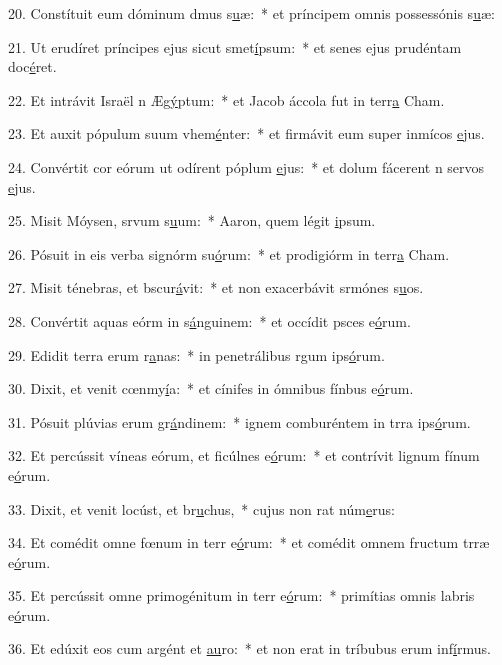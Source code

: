 20. Constítuit eum dóminum dmus s\uline{u}æ:~* et príncipem omnis possessónis s\uline{u}æ:\par 
21. Ut erudíret príncipes ejus sicut smet\uline{í}psum:~* et senes ejus prudéntam doc\uline{é}ret.\par 
22. Et intrávit Israël n Æg\uline{ý}ptum:~* et Jacob áccola fut in terr\uline{a} Cham.\par 
23. Et auxit pópulum suum vhem\uline{é}nter:~* et firmávit eum super inmícos \uline{e}jus.\par 
24. Convértit cor eórum ut odírent póplum \uline{e}jus:~* et dolum fácerent n servos \uline{e}jus.\par 
25. Misit Móysen, srvum s\uline{u}um:~* Aaron, quem légit \uline{i}psum.\par 
26. Pósuit in eis verba signórm su\uline{ó}rum:~* et prodigiórm in terr\uline{a} Cham.\par 
27. Misit ténebras, et bscur\uline{á}vit:~* et non exacerbávit srmónes s\uline{u}os.\par 
28. Convértit aquas eórm in s\uline{á}nguinem:~* et occídit psces e\uline{ó}rum.\par 
29. Edidit terra erum r\uline{a}nas:~* in penetrálibus rgum ips\uline{ó}rum.\par 
30. Dixit, et venit cœnmy\uline{í}a:~* et cínifes in ómnibus fínbus e\uline{ó}rum.\par 
31. Pósuit plúvias erum gr\uline{á}ndinem:~* ignem comburéntem in trra ips\uline{ó}rum.\par 
32. Et percússit víneas eórum, et ficúlnes e\uline{ó}rum:~* et contrívit lignum fínum e\uline{ó}rum.\par 
33. Dixit, et venit locúst, et br\uline{u}chus,~* cujus non rat núm\uline{e}rus:\par 
34. Et comédit omne fœnum in terr e\uline{ó}rum:~* et comédit omnem fructum trræ e\uline{ó}rum.\par 
35. Et percússit omne primogénitum in terr e\uline{ó}rum:~* primítias omnis labris e\uline{ó}rum.\par 
36. Et edúxit eos cum argént et \uline{au}ro:~* et non erat in tríbubus erum inf\uline{í}rmus.\par 

